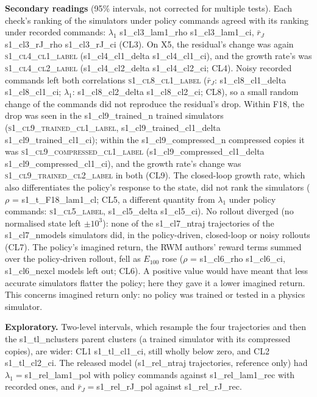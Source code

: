 \textbf{Secondary readings} (95\% intervals, not corrected for multiple tests). Each check's ranking of the
simulators under policy commands agreed with its ranking under recorded commands: $\lambda_1$
{{s1_cl3_lam1_rho}} {{s1_cl3_lam1_ci}}, $\bar r_J$ {{s1_cl3_rJ_rho}} {{s1_cl3_rJ_ci}} (CL3). On X5, the
residual's change was again \textsc{{{s1_cl4_cl1_label}}} ({{s1_cl4_cl1_delta}} {{s1_cl4_cl1_ci}}), and the growth
rate's was \textsc{{{s1_cl4_cl2_label}}} ({{s1_cl4_cl2_delta}} {{s1_cl4_cl2_ci}}; CL4). Noisy recorded commands left
both correlations \textsc{{{s1_cl8_cl1_label}}} ($\bar r_J$: {{s1_cl8_cl1_delta}} {{s1_cl8_cl1_ci}}; $\lambda_1$:
{{s1_cl8_cl2_delta}} {{s1_cl8_cl2_ci}}; CL8), so a small random change of the commands did not reproduce the
residual's drop. Within F18, the drop was seen in the {{s1_cl9_trained_n}} trained simulators
(\textsc{{{s1_cl9_trained_cl1_label}}}, {{s1_cl9_trained_cl1_delta}} {{s1_cl9_trained_cl1_ci}}); within the
{{s1_cl9_compressed_n}} compressed copies it was \textsc{{{s1_cl9_compressed_cl1_label}}}
({{s1_cl9_compressed_cl1_delta}} {{s1_cl9_compressed_cl1_ci}}), and the growth rate's change was
\textsc{{{s1_cl9_trained_cl2_label}}} in both (CL9). The closed-loop growth rate, which also differentiates the
policy's response to the state, did not rank the simulators ($\rho$ = {{s1_t_F18_lam1_cl}}; CL5, a different quantity from $\lambda_1$ under policy commands:
\textsc{{{s1_cl5_label}}}, {{s1_cl5_delta}} {{s1_cl5_ci}}). No rollout diverged (no normalised state left $\pm10^3$): none of the {{s1_cl7_ntraj}}
trajectories of the {{s1_cl7_nmodels}} simulators did, in the policy-driven, closed-loop or noisy rollouts (CL7). The policy's imagined return, the RWM authors' reward terms summed over the policy-driven rollout, fell as
$E_{100}$ rose ($\rho$ = {{s1_cl6_rho}} {{s1_cl6_ci}}, {{s1_cl6_nexcl}} models left out; CL6). A positive value
would have meant that less accurate simulators flatter the policy; here they gave it a lower imagined return. This
concerns imagined return only: no policy was trained or tested in a physics simulator.

\textbf{Exploratory.} Two-level intervals, which resample the four trajectories and then the
{{s1_tl_nclusters}} parent clusters (a trained simulator with its compressed copies), are wider: CL1 {{s1_tl_cl1_ci}}, still wholly below zero, and CL2
{{s1_tl_cl2_ci}}. The released model ({{s1_rel_ntraj}} trajectories, reference only) had $\lambda_1={}${{s1_rel_lam1_pol}}
with policy commands against {{s1_rel_lam1_rec}} with recorded ones, and $\bar r_J={}${{s1_rel_rJ_pol}} against
{{s1_rel_rJ_rec}}.

